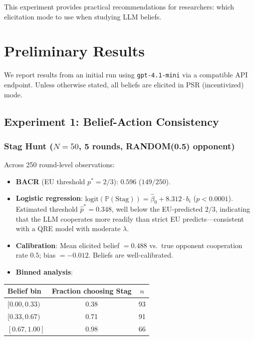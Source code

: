 \documentclass[12pt]{article}
\newcommand{\Prob}{\mathbb{P}}
\begin{document}
This experiment provides practical recommendations for researchers: which elicitation mode to use when studying LLM beliefs.


\section{Preliminary Results}
\label{sec:results}

We report results from an initial run using \texttt{gpt-4.1-mini} via a compatible API endpoint. Unless otherwise stated, all beliefs are elicited in PSR (incentivized) mode.

\subsection{Experiment 1: Belief-Action Consistency}

\subsubsection{Stag Hunt ($N=50$, 5 rounds, RANDOM(0.5) opponent)}

Across 250 round-level observations:

\begin{itemize}[nosep]
    \item \textbf{BACR} (EU threshold $p^*=2/3$): $0.596$ ($149/250$).
    \item \textbf{Logistic regression}: $\text{logit}(\Prob(\text{Stag})) = \hat\beta_0 + 8.312 \cdot b_i$ ($p < 0.0001$). Estimated threshold $\hat{p}^* = 0.348$, well below the EU-predicted $2/3$, indicating that the LLM cooperates more readily than strict EU predicts---consistent with a QRE model with moderate $\lambda$.
    \item \textbf{Calibration}: Mean elicited belief $= 0.488$ vs.\ true opponent cooperation rate $0.5$; bias $= -0.012$. Beliefs are well-calibrated.
    \item \textbf{Binned analysis}:
\end{itemize}

\begin{center}
\begin{tabular}{@{}lcc@{}}
\toprule
Belief bin & Fraction choosing Stag & $n$ \\
\midrule
$[0.00, 0.33)$ & 0.38 & 93 \\
$[0.33, 0.67)$ & 0.71 & 91 \\
$[0.67, 1.00]$ & 0.98 & 66 \\
\bottomrule
\end{tabular}
\end{center}
\end{document}
